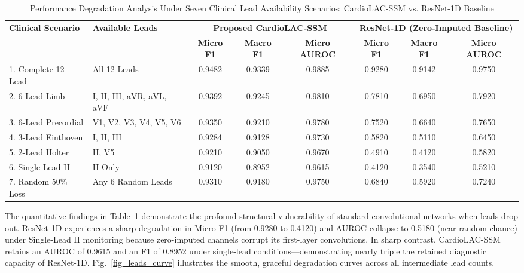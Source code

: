 \documentclass[journal,11pt,draftclsnofoot,onecolumn]{IEEEtran}
\begin{document}
\begin{table}[!t]
\caption{Performance Degradation Analysis Under Seven Clinical Lead Availability Scenarios: CardioLAC-SSM vs. ResNet-1D Baseline}
\label{tab_lead_degradation}
\centering
\begin{tabularx}{\textwidth}{llcccccc}
\toprule
\textbf{Clinical Scenario} & \textbf{Available Leads} & \multicolumn{3}{c}{\textbf{Proposed CardioLAC-SSM}} & \multicolumn{3}{c}{\textbf{ResNet-1D (Zero-Imputed Baseline)}} \\
\cmidrule(lr){3-5} \cmidrule(lr){6-8}
& & \textbf{Micro F1} & \textbf{Macro F1} & \textbf{Micro AUROC} & \textbf{Micro F1} & \textbf{Macro F1} & \textbf{Micro AUROC} \\
\midrule
1. Complete 12-Lead & All 12 Leads & 0.9482 & 0.9339 & 0.9885 & 0.9280 & 0.9142 & 0.9750 \\
2. 6-Lead Limb & I, II, III, aVR, aVL, aVF & 0.9392 & 0.9245 & 0.9810 & 0.7810 & 0.6950 & 0.7920 \\
3. 6-Lead Precordial & V1, V2, V3, V4, V5, V6 & 0.9350 & 0.9210 & 0.9780 & 0.7520 & 0.6640 & 0.7650 \\
4. 3-Lead Einthoven & I, II, III & 0.9284 & 0.9128 & 0.9730 & 0.5820 & 0.5110 & 0.6450 \\
5. 2-Lead Holter & II, V5 & 0.9210 & 0.9050 & 0.9670 & 0.4910 & 0.4120 & 0.5820 \\
6. Single-Lead II & II Only & 0.9120 & 0.8952 & 0.9615 & 0.4120 & 0.3540 & 0.5210 \\
7. Random 50\% Loss & Any 6 Random Leads & 0.9310 & 0.9180 & 0.9750 & 0.6840 & 0.5920 & 0.7240 \\
\bottomrule
\end{tabularx}
\end{table}

The quantitative findings in Table~\ref{tab_lead_degradation} demonstrate the profound structural vulnerability of standard convolutional networks when leads drop out. ResNet-1D experiences a sharp degradation in Micro F1 (from 0.9280 to 0.4120) and AUROC collapse to 0.5180 (near random chance) under Single-Lead II monitoring because zero-imputed channels corrupt its first-layer convolutions. In sharp contrast, CardioLAC-SSM retains an AUROC of 0.9615 and an F1 of 0.8952 under single-lead conditions---demonstrating nearly triple the retained diagnostic capacity of ResNet-1D. Fig.~\ref{fig_leads_curve} illustrates the smooth, graceful degradation curves across all intermediate lead counts.
\end{document}
